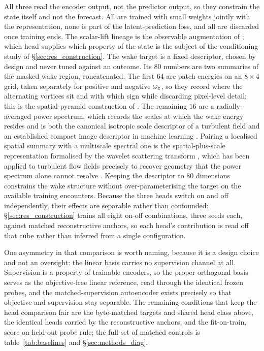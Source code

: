 All three read the encoder output, not the predictor output, so they constrain the state itself and not the forecast. All are trained with small weights jointly with the representation, none is part of the latent-prediction loss, and all are discarded once training ends. The scalar-lift lineage is the observable augmentation of \citet{fukami2023,fukami2025}; which head supplies which property of the state is the subject of the conditioning study of \S\ref{sec:res_construction}. The wake target is a fixed descriptor, chosen by design and never tuned against an outcome. Its $80$ numbers are two summaries of the masked wake region, concatenated. The first $64$ are patch energies on an $8 \times 4$ grid, taken separately for positive and negative $\omega_z$, so they record where the alternating vortices sit and with which sign while discarding pixel-level detail; this is the spatial-pyramid construction of \citet{lazebnik2006beyond}. The remaining $16$ are a radially-averaged power spectrum, which records the scales at which the wake energy resides and is both the canonical isotropic scale descriptor of a turbulent field \citep{pope2001turbulent} and an established compact image descriptor in machine learning \citep{durall2020watch}. Pairing a localised spatial summary with a multiscale spectral one is the spatial-plus-scale representation formalised by the wavelet scattering transform \citep{brunamallat2013}, which has been applied to turbulent flow fields precisely to recover geometry that the power spectrum alone cannot resolve \citep{skinner2025characterizing}. Keeping the descriptor to $80$ dimensions constrains the wake structure without over-parameterising the target on the available training encounters. Because the three heads switch on and off independently, their effects are separable rather than confounded: \S\ref{sec:res_construction} trains all eight on-off combinations, three seeds each, against matched reconstructive anchors, so each head's contribution is read off that cube rather than inferred from a single configuration.\re

One asymmetry in that comparison is worth naming, because it is a design choice and not an oversight: the linear basis carries no supervision channel at all. Supervision is a property of trainable encoders, so the proper orthogonal basis serves as the objective-free linear reference, read through the identical frozen probes, and the matched-supervision autoencoder exists precisely so that objective and supervision stay separable. The remaining conditions that keep the head comparison fair are the byte-matched targets and shared head class above, the identical heads carried by the reconstructive anchors, and the fit-on-train, score-on-held-out probe rule; the full set of matched controls is table~\ref{tab:baselines} and \S\ref{sec:methods_diag}.\re

